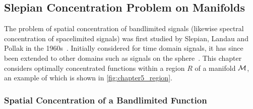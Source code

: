\subsection{Slepian Concentration Problem on Manifolds}\label{sec:chapter5_slepian_concentration_problem_manifolds}

The problem of spatial concentration of bandlimited signals (likewise spectral concentration of spacelimited signals) was first studied by Slepian, Landau and Pollak in the 1960s~\cite{Slepian1961,Landau1961,Landau1962}.
Initially considered for time domain signals, it has since been extended to other domains such as signals on the sphere~\cite{Simons2006,Roddy2021a,Xu1983,Wieczorek2005}.
This chapter considers optimally concentrated functions within a region \(R\) of a manifold \(\mathcal{M}{}\), an example of which is shown in \cref{fig:chapter5_region}.



\subsubsection{Spatial Concentration of a Bandlimited Function}


